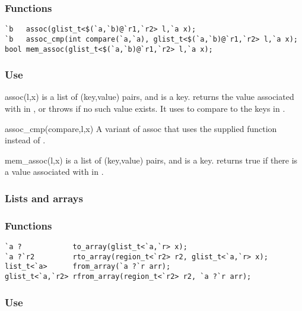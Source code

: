 \subsubsection*{Functions}
\begin{verbatim}
`b   assoc(glist_t<$(`a,`b)@`r1,`r2> l,`a x);
`b   assoc_cmp(int compare(`a,`a), glist_t<$(`a,`b)@`r1,`r2> l,`a x);
bool mem_assoc(glist_t<$(`a,`b)@`r1,`r2> l,`a x);
\end{verbatim} %

\subsubsection*{Use}

\begin{defun}{assoc}{(l,x)}
 is a list of (key,value) pairs, and  is a key.
 returns the value associated with  in , or
throws  if no such value exists.  It uses
\code{==} to compare  to the keys in .
\end{defun}

\begin{defun}{assoc_cmp}{(compare,l,x)}
A variant of assoc that uses the supplied  function instead
of \code{==}.
\end{defun}

\begin{defun}{mem_assoc}{(l,x)}
 is a list of (key,value) pairs, and  is a key.
 returns true if there is a value associated with
 in .
\end{defun}


\subsubsection*{Lists and arrays}
\subsubsection*{Functions}
\begin{verbatim}
`a ?            to_array(glist_t<`a,`r> x);
`a ?`r2         rto_array(region_t<`r2> r2, glist_t<`a,`r> x);
list_t<`a>      from_array(`a ?`r arr);
glist_t<`a,`r2> rfrom_array(region_t<`r2> r2, `a ?`r arr);
\end{verbatim}

\subsubsection*{Use}

